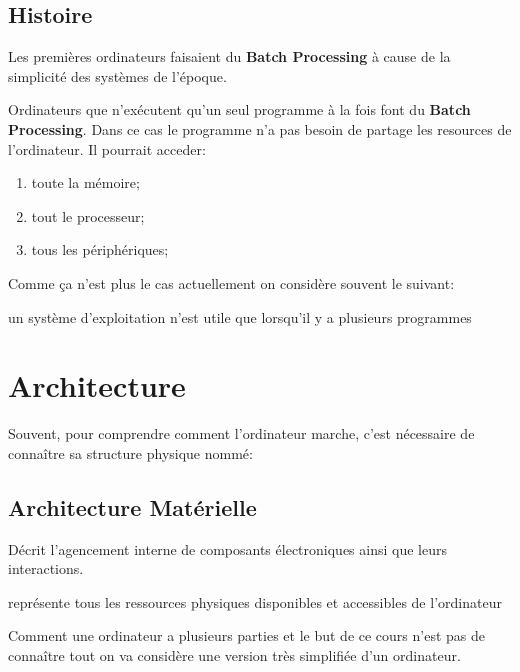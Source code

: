 \documentclass{article}
\begin{document}
\subsection{Histoire}
Les premières ordinateurs faisaient du \textbf{Batch Processing} à cause de la simplicité des systèmes de l'époque.
\begin{definition}\label{def:batchProcessing}
    Ordinateurs que n'exécutent qu'un seul programme à la fois font du \textbf{Batch Processing}. Dans ce cas le programme n'a pas besoin de partage les resources de l'ordinateur. Il pourrait acceder:
    \begin{enumerate}[noitemsep]
        \item toute la mémoire;
        \item tout le processeur;
        \item tous les périphériques;
    \end{enumerate}
\end{definition}
Comme ça n'est plus le cas actuellement on considère souvent le suivant:
\begin{phrase}
    un système d'exploitation n'est utile que lorsqu'il y a plusieurs programmes
\end{phrase}

\section{Architecture}

Souvent, pour comprendre comment l'ordinateur marche, c'est nécessaire de connaître sa structure physique nommé: 
\subsection{Architecture Matérielle}
\begin{definition}\label{def:architectureMaterielle}
    Décrit l'agencement interne de composants électroniques ainsi que leurs interactions.

    \begin{phrase}
        représente tous les ressources physiques disponibles et accessibles de l'ordinateur
    \end{phrase}
\end{definition}
Comment une ordinateur a plusieurs parties et le but de ce cours n'est pas de connaître tout on va considère une version très simplifiée d'un ordinateur.
\end{document}
